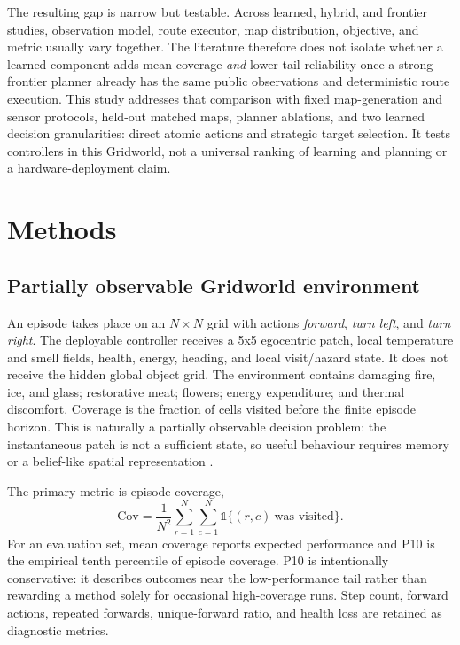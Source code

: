 \documentclass[10pt,letterpaper]{article}
\newcommand{\cov}{\mathrm{Cov}}
\begin{document}
The resulting gap is narrow but testable. Across learned, hybrid, and frontier studies, observation model, route executor, map distribution, objective, and metric usually vary together. The literature therefore does not isolate whether a learned component adds mean coverage \emph{and} lower-tail reliability once a strong frontier planner already has the same public observations and deterministic route execution. This study addresses that comparison with fixed map-generation and sensor protocols, held-out matched maps, planner ablations, and two learned decision granularities: direct atomic actions and strategic target selection. It tests controllers in this Gridworld, not a universal ranking of learning and planning or a hardware-deployment claim.

\section{Methods}

\subsection{Partially observable Gridworld environment}

An episode takes place on an $N\times N$ grid with actions \textit{forward}, \textit{turn left}, and \textit{turn right}. The deployable controller receives a 5x5 egocentric patch, local temperature and smell fields, health, energy, heading, and local visit/hazard state. It does not receive the hidden global object grid. The environment contains damaging fire, ice, and glass; restorative meat; flowers; energy expenditure; and thermal discomfort. Coverage is the fraction of cells visited before the finite episode horizon. This is naturally a partially observable decision problem: the instantaneous patch is not a sufficient state, so useful behaviour requires memory or a belief-like spatial representation \citep{kaelbling1998planning}.

The primary metric is episode coverage,
\[
\cov = \frac{1}{N^2}\sum_{r=1}^{N}\sum_{c=1}^{N}
\mathbb{1}\{(r,c)\ \text{was visited}\}.
\]
For an evaluation set, mean coverage reports expected performance and P10 is the empirical tenth percentile of episode coverage. P10 is intentionally conservative: it describes outcomes near the low-performance tail rather than rewarding a method solely for occasional high-coverage runs. Step count, forward actions, repeated forwards, unique-forward ratio, and health loss are retained as diagnostic metrics.
\end{document}
